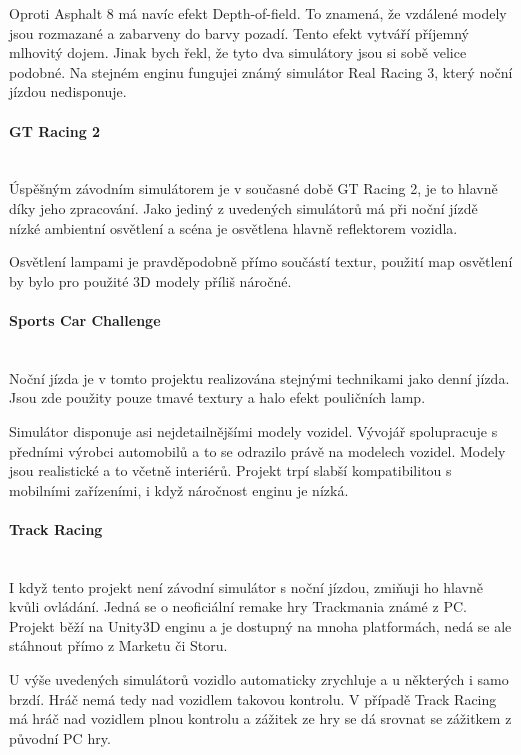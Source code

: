 \documentclass[11pt,twoside,a4paper]{book}
\begin{document}
Oproti Asphalt 8 má navíc efekt Depth-of-field. To znamená, že vzdálené modely jsou rozmazané a zabarveny do barvy pozadí. Tento efekt vytváří příjemný mlhovitý dojem. Jinak bych řekl, že tyto dva simulátory jsou si sobě velice podobné. Na stejném enginu funguje\linebreak i známý simulátor Real Racing 3, který noční jízdou nedisponuje.

\paragraph{GT Racing 2}\mbox{}\\

Úspěšným závodním simulátorem je v současné době GT Racing 2, je to hlavně díky jeho zpracování. Jako jediný z uvedených simulátorů má při noční jízdě nízké ambientní osvětlení a scéna je osvětlena hlavně reflektorem vozidla.

Osvětlení lampami je pravděpodobně přímo součástí textur, použití map osvětlení by bylo pro použité 3D modely příliš náročné.

\paragraph{Sports Car Challenge}\mbox{}\\

Noční jízda je v tomto projektu realizována stejnými technikami jako denní jízda. Jsou zde použity pouze tmavé textury a halo efekt pouličních lamp.

Simulátor disponuje asi nejdetailnějšími modely vozidel. Vývojář spolupracuje s předními výrobci automobilů a to se odrazilo právě na modelech vozidel. Modely jsou realistické a to včetně interiérů. Projekt trpí slabší kompatibilitou s mobilními zařízeními, i když náročnost enginu je nízká.

\paragraph{Track Racing}\mbox{}\\

I když tento projekt není závodní simulátor s noční jízdou, zmiňuji ho hlavně kvůli ovládání. Jedná se o neoficiální remake hry Trackmania známé z PC. Projekt běží na Unity3D enginu a je dostupný na mnoha platformách, nedá se ale stáhnout přímo z Marketu či Storu.

U výše uvedených simulátorů vozidlo automaticky zrychluje a u některých i samo brzdí. Hráč nemá tedy nad vozidlem takovou kontrolu. V případě Track Racing má hráč nad vozidlem plnou kontrolu a zážitek ze hry se dá srovnat se zážitkem z původní PC hry.
\end{document}
